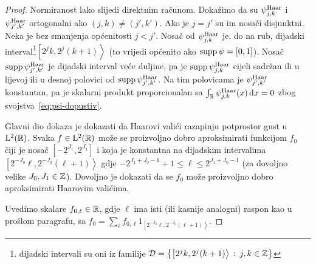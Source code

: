 \documentclass[main.tex]{subfiles}
\begin{document}
\renewcommand{\fusnota}{\footnote{dijadski intervali
su oni iz familije \( \mathcal D = \left\{ \left[ 2^jk, 2^j(k+1) \right\rangle \st j,k\in\Z \right\} \)}}
\begin{proof}
	Normiranost lako slijedi direktnim računom. Dokažimo da su
	\( \psi^{\mathrm{Haar}}_{j,k} \) i \( \psi^{\mathrm{Haar}}_{j',k'} \) ortogonalni ako \( (j,k) \neq (j',k') \).
	Ako je \( j=j' \) su im nosači disjunktni. Neka je bez smanjenja općenitosti
	\( j < j' \). Nosač od
	\( \psi^{\mathrm{Haar}}_{j,k} \) je, do na rub, dijadski interval\fusnota \( \left[ 2^jk,2^j(k+1) \right\rangle \)
	(to vrijedi općenito ako \( \operatorname{supp} \psi = \left[ 0,1 \right] \)).
	Nosač \( \operatorname{supp} \psi^{\mathrm{Haar}}_{j',k'} \) je dijadski interval veće duljine, pa je
	\( \operatorname{supp} \psi^{\mathrm{Haar}}_{j,k} \) cijeli sadržan ili u lijevoj ili u desnoj polovici
	od \( \operatorname{supp} \psi^{\mathrm{Haar}}_{j',k'} \). Na tim polovicama je \( \psi^{\mathrm{Haar}}_{j',k'} \) konstantan,
	pa je skalarni produkt proporcionalan sa \( \int_{\mathbb{R}} \psi^{\mathrm{Haar}}_{j,k}(x) \,\mathrm d x = 0 \)
	zbog svojstva~\eqref{eq:psi-dopustiv}.

	Glavni dio dokaza je dokazati da Haarovi valići
	razapinju potprostor gust u \( \mathrm{L}^2(\mathbb{R}) \). Svaka \( f \in \mathrm{L}^2(\mathbb{R}) \)
	može se proizvoljno dobro aproksimirati funkcijom \( f_0 \)
	čiji je nosač \( \left[ -2^{J_1},2^{J_1} \right] \)
	i koja je konstantna na dijadskim intervalima
	\( \left[ 2^{-J_0}\ell, 2^{-J_0}(\ell+1) \right\rangle \)
	gdje \( -2^{J_1+J_0-1}+1 \le \ell \le 2^{J_1+J_0-1} \)
	(za dovoljno velike \( J_0, J_1 \in \mathbb{Z} \)). Dovoljno je dokazati
	da se \( f_0 \) može proizvoljno dobro aproksimirati Haarovim valićima.

	Uvedimo skalare \( f_{0,\ell} \in \mathbb{R} \),
	gdje \( \ell \) ima isti (ili kasnije analogni) raspon kao u prošlom paragrafu, sa
	\( f_0 = \sum\limits_{\ell} f_{0,\ell} 1_{\left[ 2^{-J_0}\ell, 2^{-J_0}(\ell+1)  \right\rangle} \).



\end{proof}
\end{document}

